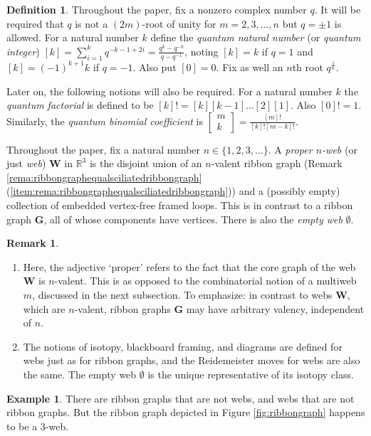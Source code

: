 \documentclass[12pt, reqno]{amsart}
\theoremstyle{definition}
\newtheorem{defi}[theo]{Definition}
\newtheorem{rema}[theo]{Remark}
\newtheorem{exam}[theo]{Example}
\newcommand{\R}{\mathbb{R}}%
\begin{document}
\begin{defi}\label{defi:quantuminteger}
Throughout the paper, fix a nonzero complex number $q$.  It will be required that $q$ is not a $(2m)$-root of unity for $m=2,3,\dots,n$ but $q=\pm1$ is allowed.    For a natural number $k$ define the \emph{quantum natural number} (or \emph{quantum integer}) $[k]=\sum_{i=1}^k q^{-k-1+2i}=\frac{q^k-q^{-k}}{q-q^{-1}}$,   noting $[k]=k$ if $q=1$ and $[k]=(-1)^{k+1}k$ if $q=-1$.  Also put $[0]=0$.  Fix as well an $n$th root $q^\frac{1}{n}$.  

Later on, the following notions will also be required.  For a natural number $k$ the \emph{quantum factorial} is defined to be $[k]!=[k][k-1]\dots[2][1]$.  Also $[0]!=1$.  Similarly, the \emph{quantum binomial coefficient} is $\begin{bmatrix}m\\k\end{bmatrix}=\frac{[m]!}{[k]![m-k]!}$.

Throughout the paper, fix a natural number $n\in\{1,2,3,\dots\}$.  A \emph{proper $n$-web} (or just \emph{web}) $\mathbf{W}$ in $\R^3$ is the disjoint union of an $n$-valent ribbon graph (Remark \ref{rema:ribbongraphequalsciliatedribbongraph} (\ref{item:rema:ribbongraphequalsciliatedribbongraph})) and a (possibly empty) collection of embedded vertex-free framed loops.  This is in contrast to a ribbon graph $\mathbf{G}$, all of whose components have vertices.  There is also the \emph{empty web} $\emptyset$.
\end{defi}

\begin{rema}
\begin{enumerate}
\item
Here, the adjective `proper' refers to the fact that the core graph of the web $\mathbf{W}$ is $n$-valent.  This is as opposed to the combinatorial notion of a multiweb $m$, discussed in the next subsection.  To emphasize: in contrast to webs $\mathbf{W}$, which are $n$-valent, ribbon graphs $\mathbf{G}$ may have arbitrary valency, independent of $n$.
\item
The notions of isotopy, blackboard framing, and diagrams are defined for webs just as for ribbon graphs, and the Reidemeister moves for webs are also the same.  The empty web $\emptyset$ is the unique representative of its isotopy class.
\end{enumerate}
\end{rema}

\begin{exam}
There are ribbon graphs that are not webs, and webs that are not ribbon graphs.  But the ribbon graph depicted in Figure \ref{fig:ribbongraph} happens to be a $3$-web.  
\end{exam}
\end{document}
